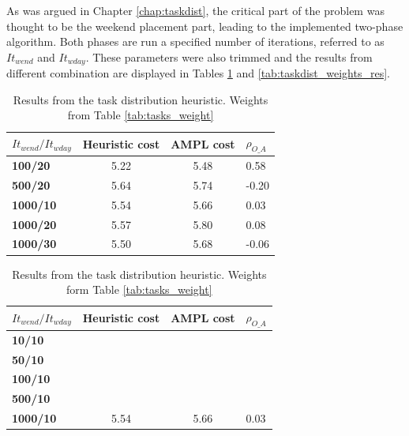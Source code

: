 As was argued in Chapter \ref{chap:taskdist}, the critical part of the problem was thought to be the weekend placement part, leading to the implemented two-phase algorithm. Both phases are run a specified number of iterations, referred to as $It_{wend}$ and $It_{wday}$. These parameters were also trimmed and the results from different combination are displayed in Tables \ref{tab:taskdist_res} and \ref{tab:taskdist_weights_res}. 

\begin{table}[!h]
\centering
\label{tab:taskdist_res}
\caption{Results from the task distribution heuristic. Weights from Table \ref{tab:tasks_weight}}
\begin{tabular}{|l|l|l|l|}
\hline
\rowcolor{Gray} \textbf{$It_{wend}/It_{wday}$} &  \textbf{Heuristic cost} &  \textbf{AMPL cost} & \textbf{$\rho_{O\_A}$} \\ \hline
\cellcolor{Gray} \textbf{100/20} & \multicolumn{1}{c|}{5.22} & \multicolumn{1}{c|}{5.48} & 0.58 \\
\cellcolor{Gray} \textbf{500/20} & \multicolumn{1}{c|}{5.64} & \multicolumn{1}{c|}{5.74} & -0.20 \\
\cellcolor{Gray} \textbf{1000/10} & \multicolumn{1}{c|}{5.54} & \multicolumn{1}{c|}{5.66} & 0.03 \\
\cellcolor{Gray} \textbf{1000/20} & \multicolumn{1}{c|}{5.57} & \multicolumn{1}{c|}{5.80} & 0.08 \\
\cellcolor{Gray} \textbf{1000/30} & \multicolumn{1}{c|}{5.50} & \multicolumn{1}{c|}{5.68} & -0.06 \\
\hline
\end{tabular}
\end{table}

\begin{table}[!h]
\centering
\label{tab:taskdist_res_new}
\caption{Results from the task distribution heuristic. Weights form Table \ref{tab:tasks_weight}}
\begin{tabular}{|l|l|l|l|}
\hline
\rowcolor{Gray} \textbf{$It_{wend}/It_{wday}$} &  \textbf{Heuristic cost} &  \textbf{AMPL cost} & \textbf{$\rho_{O\_A}$} \\ \hline
\cellcolor{Gray} \textbf{10/10} & \multicolumn{1}{c|}{} & \multicolumn{1}{c|}{} & \\
\cellcolor{Gray} \textbf{50/10} & \multicolumn{1}{c|}{} & \multicolumn{1}{c|}{} & \\
\cellcolor{Gray} \textbf{100/10} & \multicolumn{1}{c|}{} & \multicolumn{1}{c|}{} & \\
\cellcolor{Gray} \textbf{500/10} & \multicolumn{1}{c|}{} & \multicolumn{1}{c|}{} & \\
\cellcolor{Gray} \textbf{1000/10} & \multicolumn{1}{c|}{5.54} & \multicolumn{1}{c|}{5.66} & 0.03 \\
\hline
\end{tabular}
\end{table}

